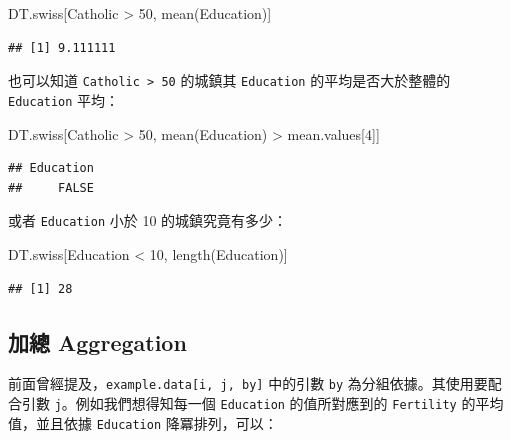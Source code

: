 \documentclass[
]{book}
\newenvironment{Shaded}{\begin{snugshade}}{\end{snugshade}}
\newcommand{\DecValTok}[1]{\textcolor[rgb]{0.00,0.00,0.81}{#1}}
\newcommand{\FunctionTok}[1]{\textcolor[rgb]{0.00,0.00,0.00}{#1}}
\newcommand{\NormalTok}[1]{#1}
\newcommand{\SpecialCharTok}[1]{\textcolor[rgb]{0.00,0.00,0.00}{#1}}
\theoremstyle{definition}
\theoremstyle{remark}
\begin{document}
\begin{Shaded}
\begin{Highlighting}[]
\NormalTok{DT.swiss[Catholic }\SpecialCharTok{\textgreater{}} \DecValTok{50}\NormalTok{, }\FunctionTok{mean}\NormalTok{(Education)]}
\end{Highlighting}
\end{Shaded}

\begin{verbatim}
## [1] 9.111111
\end{verbatim}

也可以知道 \texttt{Catholic\ \textgreater{}\ 50} 的城鎮其 \texttt{Education} 的平均是否大於整體的 \texttt{Education} 平均：

\begin{Shaded}
\begin{Highlighting}[]
\NormalTok{DT.swiss[Catholic }\SpecialCharTok{\textgreater{}} \DecValTok{50}\NormalTok{, }\FunctionTok{mean}\NormalTok{(Education) }\SpecialCharTok{\textgreater{}}\NormalTok{ mean.values[}\DecValTok{4}\NormalTok{]]}
\end{Highlighting}
\end{Shaded}

\begin{verbatim}
## Education 
##     FALSE
\end{verbatim}

或者 \texttt{Education} 小於 10 的城鎮究竟有多少：

\begin{Shaded}
\begin{Highlighting}[]
\NormalTok{DT.swiss[Education }\SpecialCharTok{\textless{}} \DecValTok{10}\NormalTok{, }\FunctionTok{length}\NormalTok{(Education)]}
\end{Highlighting}
\end{Shaded}

\begin{verbatim}
## [1] 28
\end{verbatim}

\hypertarget{ux52a0ux7e3d-aggregation}{%
\subsection{加總 Aggregation}\label{ux52a0ux7e3d-aggregation}}

前面曾經提及，\texttt{example.data{[}i,\ j,\ by{]}} 中的引數 \texttt{by} 為分組依據。其使用要配合引數 \texttt{j}。例如我們想得知每一個 \texttt{Education} 的值所對應到的 \texttt{Fertility} 的平均值，並且依據 \texttt{Education} 降冪排列，可以：
\end{document}
